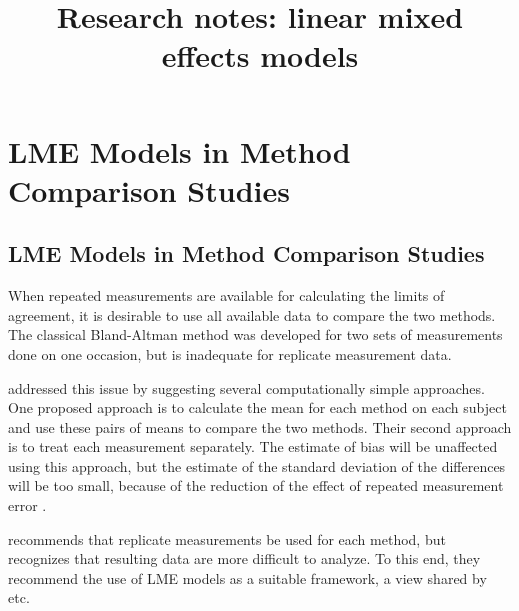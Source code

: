 \documentclass[12pt, a4paper]{report}
\title{Research notes: linear mixed effects models}
\author{ } \date{ }
\theoremstyle{plain}
\theoremstyle{definition}
\theoremstyle{remark}
\begin{document}
\chapter{LME Models in Method Comparison Studies}

\section{LME Models in Method Comparison Studies}

When repeated measurements are available for calculating the limits of agreement, it is desirable to use all available data to compare the two methods. The classical Bland-Altman method was developed for two sets of measurements done on one occasion, but is inadequate for replicate measurement data.

\citet{BA99} addressed this issue by suggesting several computationally simple approaches.  One proposed approach is to calculate the mean for each method on each subject and use these pairs of means to compare the two methods. Their second approach is to treat each measurement separately.
The estimate of bias will be unaffected using this approach, but the estimate of the standard deviation of the differences will be too small, because of the reduction of the effect of repeated measurement error \citep{BXC2004,BXC2008}.

\citet{BXC2008} recommends that replicate measurements be used for each method, but recognizes that resulting data are more difficult to analyze. To this end, they recommend the use of LME models as a suitable framework, a view shared by \citet{ARoy2009} etc.



\end{document}
